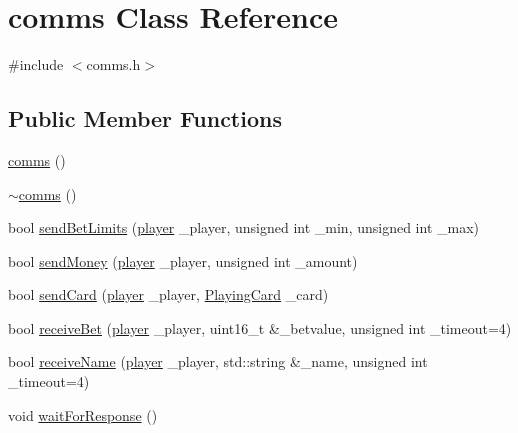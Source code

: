 \hypertarget{classcomms}{\section{comms Class Reference}
\label{classcomms}
}


{\ttfamily \#include $<$comms.\-h$>$}

\subsection*{Public Member Functions}
\begin{DoxyCompactItemize}
\item 
\hyperlink{classcomms_aa541c6457fd88519ab04f7a8d36e21f7}{comms} ()
\item 
\hyperlink{classcomms_ac404616cacbf19cdde39823aada9c49d}{$\sim$comms} ()
\item 
bool \hyperlink{classcomms_a5732e61ac8d00acdec559688bc2a1577}{send\-Bet\-Limits} (\hyperlink{classplayer}{player} \-\_\-player, unsigned int \-\_\-min, unsigned int \-\_\-max)
\item 
bool \hyperlink{classcomms_af04ca6358d651fb6f1a136328566a68a}{send\-Money} (\hyperlink{classplayer}{player} \-\_\-player, unsigned int \-\_\-amount)
\item 
bool \hyperlink{classcomms_a96eb40e27a3e3095d5ea2393bb9b6e94}{send\-Card} (\hyperlink{classplayer}{player} \-\_\-player, \hyperlink{classPlayingCard}{Playing\-Card} \-\_\-card)
\item 
bool \hyperlink{classcomms_a4f6ede211bd95c89dfe26077237729c0}{receive\-Bet} (\hyperlink{classplayer}{player} \-\_\-player, uint16\-\_\-t \&\-\_\-betvalue, unsigned int \-\_\-timeout=4)
\item 
bool \hyperlink{classcomms_abd87b6b67848137b3cfb9aaf0f1a195e}{receive\-Name} (\hyperlink{classplayer}{player} \-\_\-player, std\-::string \&\-\_\-name, unsigned int \-\_\-timeout=4)
\item 
void \hyperlink{classcomms_a057f97840d6173efe46c0f893a5022f8}{wait\-For\-Response} ()
\end{DoxyCompactItemize}


